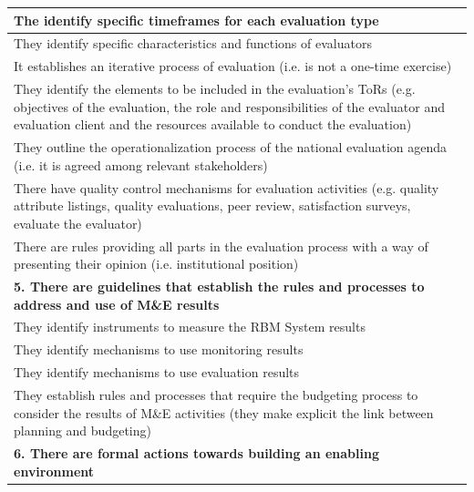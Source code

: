 \documentclass[
  10pt,
]{book}
\begin{document}
\begin{table}
\begin{tabular}[t]{l}
\hline
\hspace{1em}The identify specific timeframes for each evaluation type\\
\hline
\hspace{1em}They identify specific characteristics and functions of evaluators\\
\hline
\hspace{1em}It establishes an iterative process of evaluation (i.e. is not a one-time exercise)\\
\hline
\hspace{1em}They identify the elements to be included in the evaluation's ToRs (e.g. objectives of the evaluation, the role and responsibilities of the evaluator and evaluation client and the resources available to conduct the evaluation)\\
\hline
\hspace{1em}They outline the operationalization process of the national evaluation agenda (i.e. it is agreed among relevant stakeholders)\\
\hline
\hspace{1em}There have quality control mechanisms for evaluation activities (e.g. quality attribute listings, quality evaluations, peer review, satisfaction surveys, evaluate the evaluator)\\
\hline
\hspace{1em}There are rules providing all parts in the evaluation process with a way of presenting their opinion (i.e. institutional position)\\
\hline
\multicolumn{1}{l}{\textbf{5. There are guidelines that establish the rules and processes to address and use of M\&E results}}\\
\hline
\hspace{1em}They identify instruments to measure the RBM System results\\
\hline
\hspace{1em}They identify mechanisms to use monitoring results\\
\hline
\hspace{1em}They identify mechanisms to use evaluation results\\
\hline
\hspace{1em}They establish rules and processes that require the budgeting process to consider the results of M\&E activities (they make explicit the link between planning and budgeting)\\
\hline
\multicolumn{1}{l}{\textbf{6. There are formal actions towards building an enabling environment}}\\

\end{tabular}
\end{table}
\end{document}
